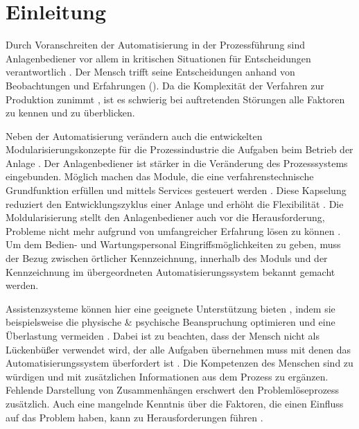 
\chapter{Einleitung}
\label{sec:Einleitung}

Durch Voranschreiten der Automatisierung in der Prozessführung sind Anlagenbediener vor allem in kritischen Situationen für Entscheidungen verantwortlich \cite{Bainbridge1983}. Der Mensch trifft seine Entscheidungen anhand von Beobachtungen und Erfahrungen (). Da die Komplexität der Verfahren zur Produktion zunimmt \cite{Poetter2007}, ist es schwierig bei auftretenden Störungen alle Faktoren zu kennen und zu überblicken. 

Neben der Automatisierung verändern auch die entwickelten Modularisierungskonzepte für die Prozessindustrie die Aufgaben beim Betrieb der Anlage \cite{Muller2017}. Der Anlagenbediener ist stärker in die Veränderung des Prozesssystems eingebunden. Möglich machen das Module, die eine verfahrenstechnische Grundfunktion erfüllen und mittels Services gesteuert werden \cite{Bloch2017}. Diese Kapselung reduziert den Entwicklungszyklus einer Anlage und erhöht die Flexibilität \cite{ZVEI2015}. Die Moldularisierung stellt den Anlagenbediener auch vor die Herausforderung, Probleme nicht mehr aufgrund von umfangreicher Erfahrung lösen zu können \cite{Muller2018}. \glqq Um dem Bedien- und Wartungspersonal Eingriffsmöglichkeiten zu geben, muss der Bezug zwischen örtlicher Kennzeichnung, innerhalb des Moduls und der Kennzeichnung im übergeordneten Automatisierungssystem bekannt gemacht werden.\grqq \ \cite{Obst2013}

Assistenzsysteme können hier eine geeignete Unterstützung bieten \cite{Dalgleish2007}, indem sie beispielsweise die physische \& psychische Beanspruchung optimieren und eine Überlastung vermeiden \cite{Weisner2018}. Dabei ist zu beachten, dass der Mensch nicht als Lückenbüßer verwendet wird, der alle Aufgaben übernehmen muss mit denen das Automatisierungssystem überfordert ist \cite{Weisner2018}. Die Kompetenzen des Menschen sind zu würdigen und mit zusätzlichen Informationen aus dem Prozess zu ergänzen. Fehlende Darstellung von Zusammenhängen erschwert den Problemlöseprozess zusätzlich. Auch eine mangelnde Kenntnis über die Faktoren, die einen Einfluss auf das Problem haben, kann zu Herausforderungen führen \cite{Herczeg2006}.

